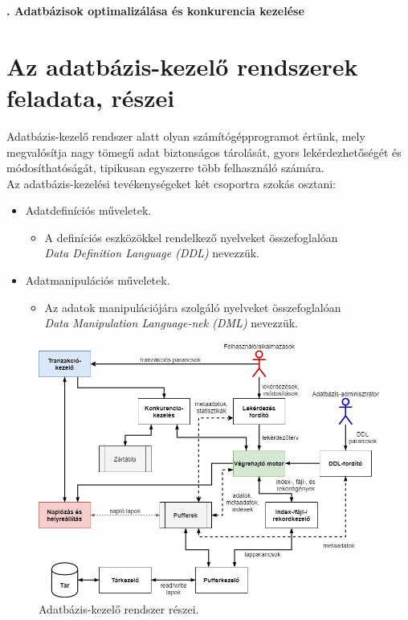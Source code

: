 \documentclass[12pt,margin=0px]{article}
\begin{document}
    \thispagestyle{fancy}

    \begin{center}
        {\Large\bfseries{}. Adatbázisok optimalizálása és konkurencia kezelése} \\
    \end{center}
    	
	\section*{Az adatbázis-kezelő rendszerek feladata, részei}
	
	Adatbázis-kezelő rendszer alatt olyan számítógépprogramot értünk, mely megvalósítja nagy tömegű adat biztonságos tárolását, gyors lekérdezhetőségét és módosíthatóságát, tipikusan egyszerre	több felhasználó számára.\\
	
	\noindent Az adatbázis-kezelési tevékenységeket két csoportra szokás osztani:
    \begin{itemize}
      \item Adatdefiníciós műveletek.
      \begin{itemize}
        \item A definíciós eszközökkel rendelkező nyelveket összefoglalóan\\ \emph{Data Definition Language (DDL)} nevezzük.
      \end{itemize}
      \item Adatmanipulációs műveletek.
      \begin{itemize}
        \item Az adatok manipulációjára szolgáló nyelveket összefoglalóan\\ \emph{Data Manipulation Language-nek (DML)} nevezzük.
      \end{itemize}
    \end{itemize}
	
	\begin{figure}[H]
		\centering
		\includegraphics[width=1.0\linewidth]{img/db_felepites}
		\caption{Adatbázis-kezelő rendszer részei.}
		\label{fig:db_felepites}
	\end{figure}
	
\end{document}
